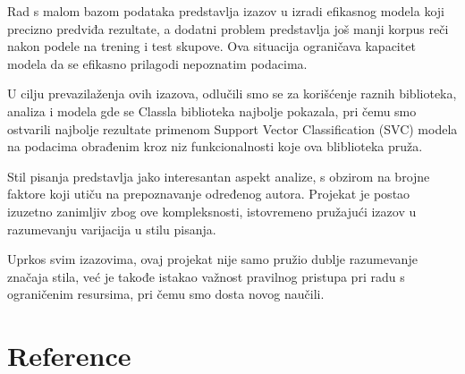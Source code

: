 \documentclass{article}
\begin{document}
\begin{flushleft}


Rad s malom bazom podataka predstavlja izazov u izradi efikasnog modela koji 
precizno predviđa rezultate, a dodatni problem predstavlja još manji korpus reči 
nakon podele na trening i test skupove. Ova situacija ograničava kapacitet modela 
da se efikasno prilagodi nepoznatim podacima.\\

\vspace{10pt}

U cilju prevazilaženja ovih izazova, odlučili smo se za korišćenje raznih 
biblioteka, analiza i modela gde se Classla biblioteka najbolje pokazala, pri čemu
smo ostvarili najbolje rezultate primenom Support Vector Classification (SVC) 
modela na podacima obrađenim kroz niz funkcionalnosti koje ova bliblioteka pruža. \\
\vspace{10pt}

Stil pisanja predstavlja jako interesantan aspekt analize, s obzirom na brojne 
faktore koji utiču na prepoznavanje određenog autora. Projekat je postao izuzetno 
zanimljiv zbog ove kompleksnosti, istovremeno pružajući izazov u razumevanju 
varijacija u stilu pisanja.\\

\vspace{10pt}

Uprkos svim izazovima, ovaj projekat nije samo pružio dublje razumevanje značaja 
stila, već je takođe istakao važnost pravilnog pristupa pri radu s ograničenim 
resursima, pri čemu smo dosta novog naučili.


\end{flushleft}
\newpage



\section{Reference}
\end{document}
